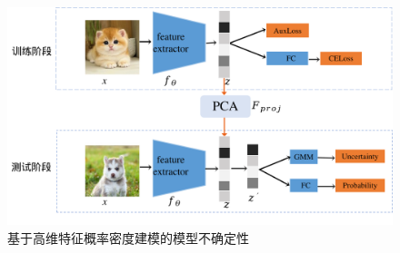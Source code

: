 


\begin{figure}[h]
    \centering
    \includegraphics[width=1.\linewidth]{assets/structure3.png}
    \caption{基于高维特征概率密度建模的模型不确定性}
    \label{tag:模型结构图3}
\end{figure}


